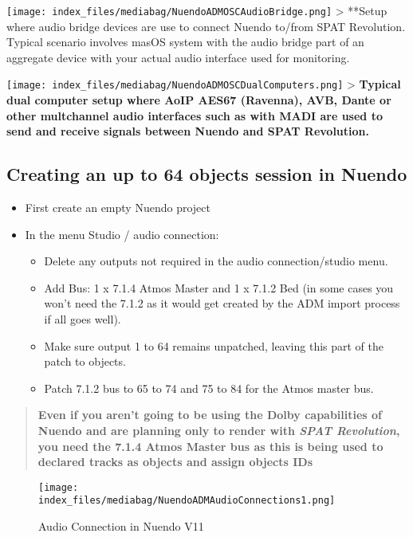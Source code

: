 \documentclass[
  letterpaper,
  DIV=11,
  numbers=noendperiod]{scrreport}
\providecommand{\tightlist}{%
  \setlength{\itemsep}{0pt}\setlength{\parskip}{0pt}}\usepackage{longtable,booktabs,array}
\begin{document}
\texttt{[image: index\_files/mediabag/NuendoADMOSCAudioBridge.png]}
\textgreater{} **Setup where audio bridge devices are use to connect
Nuendo to/from SPAT Revolution. Typical scenario involves masOS system
with the audio bridge part of an aggregate device with your actual audio
interface used for monitoring.

\texttt{[image: index\_files/mediabag/NuendoADMOSCDualComputers.png]}
\textgreater{} \textbf{Typical dual computer setup where AoIP AES67
(Ravenna), AVB, Dante or other multchannel audio interfaces such as with
MADI are used to send and receive signals between Nuendo and SPAT
Revolution.}

\hypertarget{creating-an-up-to-64-objects-session-in-nuendo}{%
\subsection{Creating an up to 64 objects session in
Nuendo}\label{creating-an-up-to-64-objects-session-in-nuendo}}

\begin{itemize}
\tightlist
\item
  First create an empty Nuendo project
\item
  In the menu Studio / audio connection:

  \begin{itemize}
  \tightlist
  \item
    Delete any outputs not required in the audio connection/studio menu.
  \item
    Add Bus: 1 x 7.1.4 Atmos Master and 1 x 7.1.2 Bed (in some cases you
    won't need the 7.1.2 as it would get created by the ADM import
    process if all goes well).
  \item
    Make sure output 1 to 64 remains unpatched, leaving this part of the
    patch to objects.
  \item
    Patch 7.1.2 bus to 65 to 74 and 75 to 84 for the Atmos master bus.
  \end{itemize}
\end{itemize}

\begin{quote}
\textbf{Even if you aren't going to be using the Dolby capabilities of
Nuendo and are planning only to render with \emph{SPAT Revolution}, you
need the 7.1.4 Atmos Master bus as this is being used to declared tracks
as objects and assign objects IDs}
\end{quote}

\begin{figure}

{\centering \texttt{[image: index\_files/mediabag/NuendoADMAudioConnections1.png]}

}

\caption{Audio Connection in Nuendo V11}

\end{figure}
\end{document}
